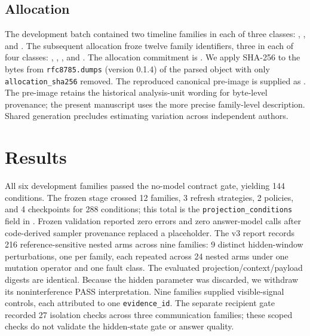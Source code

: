 \documentclass[11pt]{article}
\begin{document}
\subsection{Allocation}
The development batch contained two timeline families in each of three classes: , , and . The subsequent allocation froze twelve family identifiers, three in each of four classes: , , , and . The allocation commitment is \texttt{}. We apply SHA-256 to the bytes from \texttt{rfc8785.dumps} (version 0.1.4) of the parsed  object with only \texttt{allocation\_sha256} removed. The reproduced canonical pre-image is supplied as . The pre-image retains the historical analysis-unit wording for byte-level provenance; the present manuscript uses the more precise family-level description. Shared generation precludes estimating variation across independent authors.

\section{Results}
All six development families passed the no-model contract gate, yielding 144 conditions. The frozen stage crossed 12 families, 3 refresh strategies, 2 policies, and 4 checkpoints for 288 conditions; this total is the \texttt{projection\_conditions} field in . Frozen validation reported zero errors and zero answer-model calls after code-derived sampler provenance replaced a placeholder. The v3 report records 216 reference-sensitive nested arms across nine families: 9 distinct hidden-window perturbations, one per family, each repeated across 24 nested arms under one mutation operator and one fault class. The evaluated projection/context/payload digests are identical. Because the hidden parameter was discarded, we withdraw its noninterference PASS interpretation. Nine families supplied visible-signal controls, each attributed to one \texttt{evidence\_id}. The separate recipient gate recorded 27 isolation checks across three communication families; these scoped checks do not validate the hidden-state gate or answer quality.
\end{document}
